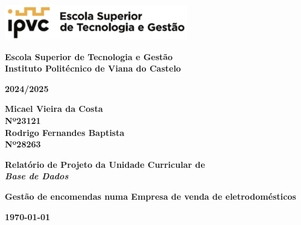 \documentclass{article}
\begin{document}

\begin{titlepage}
    \begin{center}
        \includegraphics[width=0.6\textwidth]{imagens/estg.png} \vspace{1.5cm}
        
        \textbf{\Large Escola Superior de Tecnologia e Gestão \\ Instituto Politécnico de Viana do Castelo} \vspace{2cm}
        
        \textbf{\Large 2024/2025} \vspace{1.5cm}
        
        \textbf{Micael Vieira da Costa \\ Nº23121 \\ Rodrigo Fernandes Baptista \\ Nº28263 \\  } \vspace{1.5cm}
        
        \textbf{\Large Relatório de Projeto da Unidade Curricular de \\ \textit{Base de Dados}} \vspace{1.5cm}
        
        \textbf{\Large Gestão de encomendas numa Empresa de venda de eletrodomésticos} \vspace{4cm}
        
        \textbf{\today}
    \end{center}
\end{titlepage}

\renewcommand*\contentsname{Índice}
\tableofcontents
\newpage
\newpage

\end{document}
